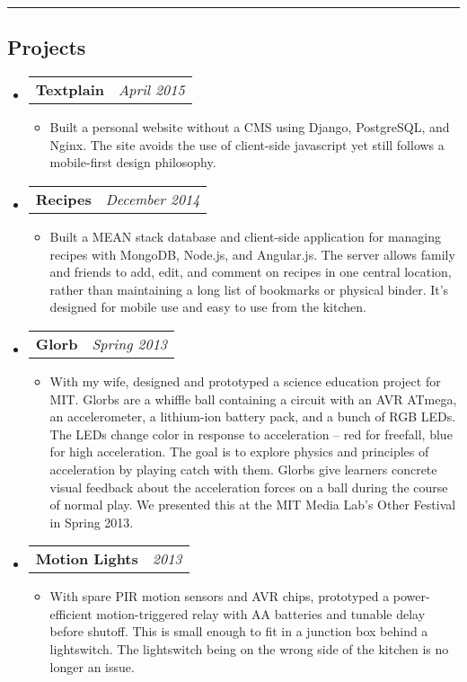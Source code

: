 \documentclass[10pt,letterpaper]{article}
\makeatletter
\newcommand{\headerrow}[2]
{\begin{tabular*}{\linewidth}{l@{\extracolsep{\fill}}r}
	#1 &
	#2 \\
\end{tabular*}}
\makeatother
\begin{document}
\hrule
\vspace{-0.4em}
\subsection*{Projects}
    \begin{itemize}
        \item \headerrow{\textbf{Textplain}}{\emph{April 2015}}
        \begin{itemize}
            \item Built a personal website without a CMS using Django, PostgreSQL, and Nginx.  The site avoids the use of client-side javascript yet still follows a mobile-first design philosophy.
        \end{itemize}

        \item \headerrow{\textbf{Recipes}}{\emph{December 2014}}
        \begin{itemize}
            \item Built a MEAN stack database and client-side application for managing recipes with MongoDB, Node.js, and Angular.js.  The server allows family and friends to add, edit, and comment on recipes in one central location, rather than maintaining a long list of bookmarks or physical binder.  It's designed for mobile use and easy to use from the kitchen.
        \end{itemize}

        \item \headerrow{\textbf{Glorb}}{\emph{Spring 2013}}
        \begin{itemize}
            \item With my wife, designed and prototyped a science education project for MIT\@.  Glorbs are a whiffle ball containing a circuit with an AVR ATmega, an accelerometer, a lithium-ion battery pack, and a bunch of RGB LEDs.  The LEDs change color in response to acceleration -- red for freefall, blue for high acceleration.  The goal is to explore physics and principles of acceleration by playing catch with them.  Glorbs give learners concrete visual feedback about the acceleration forces on a ball during the course of normal play.  We presented this at the MIT Media Lab's Other Festival in Spring 2013.
        \end{itemize}

        \item \headerrow{\textbf{Motion Lights}}{\emph{2013}}
        \begin{itemize}
            \item With spare PIR motion sensors and AVR chips, prototyped a power-efficient motion-triggered relay with AA batteries and tunable delay before shutoff.  This is small enough to fit in a junction box behind a lightswitch.  The lightswitch being on the wrong side of the kitchen is no longer an issue.
        \end{itemize}
    \end{itemize}
\end{document}
